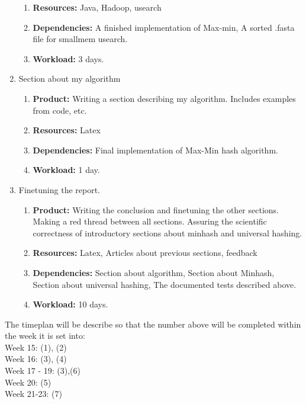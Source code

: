 \documentclass[../../main.tex]{subfiles}
\begin{document}
\begin{enumerate}
\begin{enumerate}
\item {\bf Resources:} Java, Hadoop, usearch
\item {\bf Dependencies:} A finished implementation of Max-min, A sorted .fasta file for smallmem usearch.
\item {\bf Workload:} 3 days.
\end{enumerate}
\item Section about my algorithm
\begin{enumerate}
\item {\bf Product:} Writing a section describing my algorithm. Includes examples from code, etc.
\item {\bf Resources:} Latex
\item {\bf Dependencies:} Final implementation of Max-Min hash algorithm.
\item {\bf Workload:} 1 day.
\end{enumerate}
\item Finetuning the report.
\begin{enumerate}
\item {\bf Product:} Writing the conclusion and finetuning the other sections. Making a red thread between all sections. Assuring the scientific correctness of introductory sections about minhash and universal hashing.
\item {\bf Resources:} Latex, Articles about previous sections, feedback
\item {\bf Dependencies:}  Section about algorithm, Section about Minhash, Section about universal hashing, The documented tests described above. 
\item {\bf Workload:} 10 days.
\end{enumerate}
\end{enumerate}

The timeplan will be describe so that the number above will be completed within the week it is set into:\\

\noindent Week 15: (1), (2)\\
Week 16: (3), (4)\\
Week 17 - 19: (3),(6)\\
Week 20: (5)\\
Week 21-23: (7)


 
 
\end{document}
